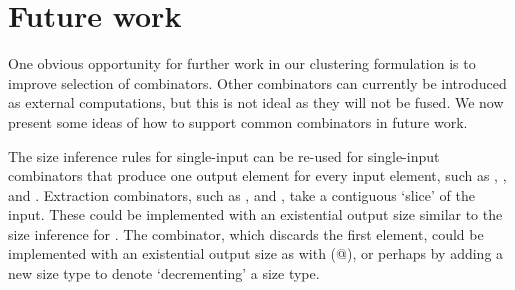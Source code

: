 

\section{Future work}
\label{clustering:s:FutureWork}


One obvious opportunity for further work in our clustering formulation is to improve selection of combinators.
Other combinators can currently be introduced as external computations, but this is not ideal as they will not be fused.
We now present some ideas of how to support common combinators in future work.

The size inference rules for single-input \Hs@map@ can be re-used for single-input combinators that produce one output element for every input element, such as \Hs@postscanl@, \Hs@prescanl@, and \Hs@indexed@.
Extraction combinators, such as \Hs@slice@, \Hs@take@ and \Hs@drop@, take a contiguous `slice' of the input.
These could be implemented with an existential output size similar to the size inference for \Hs@filter@.
The \Hs@tail@ combinator, which discards the first element, could be implemented with an existential output size as with (@), or perhaps by adding a new size type to denote `decrementing' a size type.

